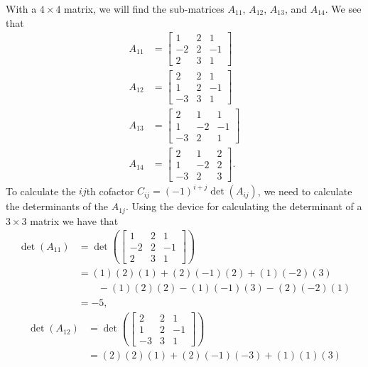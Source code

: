 \begin{example}
\item With a $4 \times 4$ matrix, we will find the sub-matrices $A_{11}$, $A_{12}$, $A_{13}$, and $A_{14}$. We see that 
\begin{align*}
A_{11} &= \left[ \begin{array}{rcr}  1&2&1 \\ -2&2&-1 \\ 2&3&1  \end{array} \right] \\
A_{12} &= \left[ \begin{array}{rcr}  2&2&1 \\ 1&2&-1 \\ -3&3&1  \end{array} \right]\\
A_{13} &= \left[ \begin{array}{rrr}  2&1&1 \\ 1&-2&-1 \\ -3&2&1  \end{array} \right]\\
A_{14} &= \left[ \begin{array}{rrc}  2&1&2 \\ 1&-2&2 \\ -3&2&3  \end{array} \right].
\end{align*}
To calculate the $ij$th cofactor $C_{ij} = (-1)^{i+j}\det(A_{ij})$, we need to calculate the determinants of the $A_{1j}$. Using the device for calculating the determinant of a $3 \times 3$ matrix we have that 
\begin{align*}
\det(A_{11}) &=\det\left( \left[ \begin{array}{rrr}  1&2&1 \\ -2&2&-1 \\ 2&3&1  \end{array} \right] \right) \\
	&= (1)(2)(1)+(2)(-1)(2)+(1)(-2)(3) \\
	&\qquad - (1)(2)(2)-(1)(-1)(3)-(2)(-2)(1) \\
	&= -5,
\end{align*}
\begin{align*}
\det(A_{12}) &= \det\left(\left[ \begin{array}{rcr}  2&2&1 \\ 1&2&-1 \\ -3&3&1  \end{array} \right] \right) \\
	&= (2)(2)(1)+(2)(-1)(-3)+(1)(1)(3) \\

\end{align*}
\end{example}
